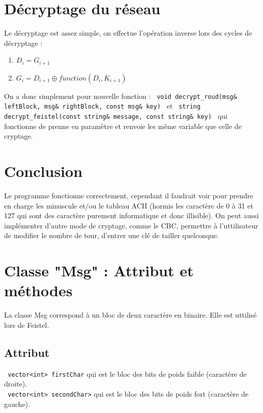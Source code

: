\documentclass[10pt,a4paper]{article}
\begin{document}
\section{Décryptage du réseau}
Le décryptage est assez simple, on effectue l'opération inverse lors des cycles de décryptage :
\begin{enumerate}
\item $D_i = G_{i+1}$
\item $G_i = D_{i+1} \oplus function(D_i, K_{i+1})$\\
\end{enumerate}
On a donc simplement pour nouvelle fonction : \verb| void decrypt_roud(msg& leftBlock, msg& rightBlock, const msg& key) | et \verb| string decrypt_feistel(const string& message, const string& key) | qui fonctionne de prenne en paramètre et renvoie les même variable que celle de cryptage.
\section{Conclusion}
Le programme fonctionne correctement, cependant il faudrait voir pour prendre en charge les minuscule et/ou le tableau ACII (hormis les caractère de 0 à 31 et 127 qui sont des caractère purement informatique et donc illisible). On peut aussi implémenter d'autre mode de cryptage, comme le CBC, permettre à l'uttilisateur de modifier le nombre de tour, d'entrer une clé de tailler quelconque.
\newpage
\appendix
\section{Classe "Msg" : Attribut et méthodes \label{msg}}
La classe Msg correspond à un bloc de deux caractère en binaire. Elle est uttilisé lors de Feistel.
\subsection*{Attribut}
\verb| vector<int> firstChar| qui est le bloc des bits de poids faible (caractère de droite).\\
\verb| vector<int> secondChar>| qui est le bloc des bits de poids fort (caractère de gauche).
\end{document}

